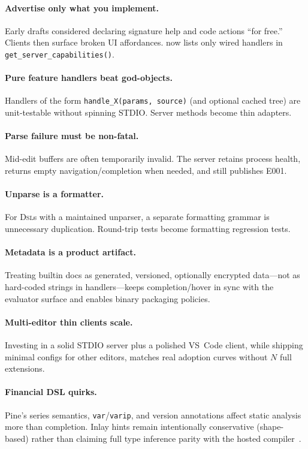 \documentclass[11pt,a4paper]{article}
\begin{document}
\paragraph{Advertise only what you implement.}
Early drafts considered declaring signature help and code actions ``for free.'' Clients
then surface broken UI affordances. \pyne{} now lists only wired handlers in
\texttt{get\_server\_capabilities()}.

\paragraph{Pure feature handlers beat god-objects.}
Handlers of the form \texttt{handle\_X(params, source)} (and optional cached tree) are
unit-testable without spinning STDIO. Server methods become thin adapters.

\paragraph{Parse failure must be non-fatal.}
Mid-edit buffers are often temporarily invalid. The server retains process health,
returns empty navigation/completion when needed, and still publishes E001.

\paragraph{Unparse is a formatter.}
For \textsc{Dsl}s with a maintained unparser, a separate formatting grammar is
unnecessary duplication. Round-trip tests become formatting regression tests.

\paragraph{Metadata is a product artifact.}
Treating builtin docs as generated, versioned, optionally encrypted data---not as
hard-coded strings in handlers---keeps completion/hover in sync with the evaluator
surface and enables binary packaging policies.

\paragraph{Multi-editor thin clients scale.}
Investing in a solid STDIO server plus a polished VS~Code client, while shipping
minimal configs for other editors, matches real adoption curves without \(N\) full
extensions.

\paragraph{Financial DSL quirks.}
Pine's series semantics, \texttt{var}/\texttt{varip}, and version annotations affect
static analysis more than completion. Inlay hints remain intentionally conservative
(shape-based) rather than claiming full type inference parity with the hosted
compiler~\citep{nystrom2021crafting,pierce2002types}.
\end{document}
